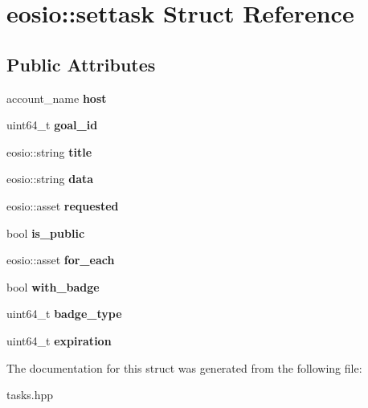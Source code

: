 \hypertarget{structeosio_1_1settask}{}\section{eosio\+:\+:settask Struct Reference}
\label{structeosio_1_1settask}
\subsection*{Public Attributes}
\begin{DoxyCompactItemize}
\item 
\mbox{\label{structeosio_1_1settask_a43fe3baf19e27540baa915bd916baf4a}} 
account\+\_\+name {\bfseries host}
\item 
\mbox{\label{structeosio_1_1settask_ab75cba9af6fa413ecd0f113f2cf9249d}} 
uint64\+\_\+t {\bfseries goal\+\_\+id}
\item 
\mbox{\label{structeosio_1_1settask_a62b08b763606b6015209adb43d6ed69c}} 
eosio\+::string {\bfseries title}
\item 
\mbox{\label{structeosio_1_1settask_a73de8017922da4244dc6a7e43f99b56c}} 
eosio\+::string {\bfseries data}
\item 
\mbox{\label{structeosio_1_1settask_a8ff4b038495416f84dc41aae3f703488}} 
eosio\+::asset {\bfseries requested}
\item 
\mbox{\label{structeosio_1_1settask_a6884dabd36d71506eb2fab0361aab3f5}} 
bool {\bfseries is\+\_\+public}
\item 
\mbox{\label{structeosio_1_1settask_ab09b64f22b61e743e9662c5bf508a52e}} 
eosio\+::asset {\bfseries for\+\_\+each}
\item 
\mbox{\label{structeosio_1_1settask_ac9393c089cac061dcb13fe745f7c9b53}} 
bool {\bfseries with\+\_\+badge}
\item 
\mbox{\label{structeosio_1_1settask_a7c7134fd4316d428225c488ed7572da0}} 
uint64\+\_\+t {\bfseries badge\+\_\+type}
\item 
\mbox{\label{structeosio_1_1settask_a37f24ab13bbaede91e282b4b66778507}} 
uint64\+\_\+t {\bfseries expiration}
\end{DoxyCompactItemize}


The documentation for this struct was generated from the following file\+:\begin{DoxyCompactItemize}
\item 
tasks.\+hpp\end{DoxyCompactItemize}

